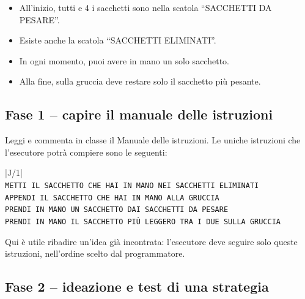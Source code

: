 \begin{itemize}
\item
  All'inizio, tutti e 4 i sacchetti sono nella scatola ``SACCHETTI DA PESARE''.
\item
  Esiste anche la scatola ``SACCHETTI ELIMINATI''.
\item
  In ogni momento, puoi avere in mano un solo sacchetto.
\item
  Alla fine, sulla gruccia deve restare solo il sacchetto più pesante.
\end{itemize}

\subsection{Fase 1 -- capire il manuale delle istruzioni }\label{fase-1-capire-il-manuale-delle-istruzioni}

Leggi e commenta in classe il Manuale delle istruzioni. Le uniche istruzioni che l'esecutore potrà compiere sono le seguenti:

\begin{center}
\manualeimpostazioni
\begin{tabular}{|J{\arrayrulewidth/1\relax}|}
\hline
{}
 \\
\hline
\texttt{METTI IL SACCHETTO CHE HAI IN MANO NEI SACCHETTI ELIMINATI} \\
\hline
\texttt{APPENDI IL SACCHETTO CHE HAI IN MANO ALLA GRUCCIA} \\
\hline
\texttt{PRENDI IN MANO UN SACCHETTO DAI SACCHETTI DA PESARE} \\
\hline
\texttt{PRENDI IN MANO IL SACCHETTO PIÙ LEGGERO TRA I DUE SULLA GRUCCIA} \\
\hline
\end{tabular}
\manualeripristinacolore
\end{center}




\begin{attenzione}\label{aspetto-a-cui-fare-attenzione-4}


Qui è utile ribadire un'idea già incontrata: l'esecutore deve seguire solo queste istruzioni, nell'ordine scelto dal programmatore.
\end{attenzione}


\subsection{Fase 2 -- ideazione e test di una strategia }\label{fase-2-ideazione-e-test-di-una-strategia}


